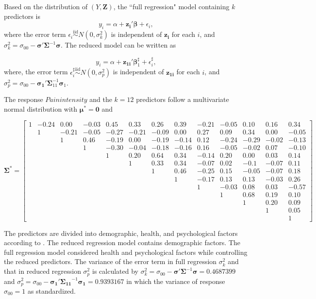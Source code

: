 \documentclass[11pt]{article}
\begin{document}
Based on the distribution of $(Y, \boldsymbol{Z})$, the ``full regression" model containing $k$ predictors is  
$$
y_i = \alpha + \boldsymbol{z_i}'\boldsymbol{\beta} + \epsilon_i,
$$
where the error term $\epsilon_i \overset{\mathrm{iid}}{\sim} N(0, \sigma^2_k)$ is independent of $\boldsymbol{z_i}$ for each $i$, 
and $\sigma^2_k = \sigma_{00} - \boldsymbol{\sigma}' \boldsymbol{\Sigma}^{-1} \boldsymbol{\sigma}$. The reduced model can be written as

$$
y_i = \alpha + \boldsymbol{z_{1i}}'\boldsymbol{\beta}_1^\sharp + \epsilon_i^\sharp,
$$
where, the error term $\epsilon_i^\sharp \overset{\mathrm{iid}}{\sim} N(0, \sigma^2_p)$ is independent of $\boldsymbol{z_{1i}}$ for each $i$, and $\sigma^2_p = \sigma_{00} - \boldsymbol{\sigma_1}' \boldsymbol{\Sigma}_{11}^{-1} \boldsymbol{\sigma}_1$. 

The response $Pain  intensity$ and the $k = 12$ predictors follow a multivariate normal distribution with $\bm{\mu}^* = \boldsymbol{0}$ and

\scriptsize{
$$
\bm{\Sigma}^* =
\left[\begin{array}{ccccccccccccc}
  1&   -0.24& 0.00 &-0.03& 0.45 &0.33 &0.26& 0.39 &-0.21& -0.05& 0.10& 0.16 &0.34\\
  &1 &-0.21& -0.05 &-0.27 &-0.21& -0.09& 0.00 &0.27& 0.09 &0.34& 0.00 &-0.05 \\
  & & 1&0.46& -0.19& 0.00& -0.19 &-0.14 &0.12& -0.24 &-0.29& -0.02& -0.13\\
  & & & 1&-0.30& -0.04 &-0.18& -0.16& 0.16 &-0.05& -0.02& 0.07& -0.10 \\
  & & & & 1&0.20& 0.64 &0.34 &-0.14& 0.20& 0.00 &0.03& 0.14 \\
  & & & & & 1&0.33 &0.34& -0.07 &0.02& -0.1& -0.07& 0.11\\
  & & & & & & 1& 0.46& -0.25 &0.15& -0.05 &-0.07 &0.18\\
  & & & & & & & 1&-0.17& 0.13& 0.13 &-0.03& 0.26\\
  & & & & & & & & 1& -0.03 &0.08 &0.03 &-0.57\\
  & & & & & & & & & 1&0.68 &0.19& 0.10\\
  & & & & & & & & & & 1&0.20 &0.09\\
  & & & & & & & & & & & 1& 0.05\\
 & & & & & & & & & & & &1
 \end{array}\right]
 $$
 }
 \normalsize
 
 
 
 
The predictors are divided into demographic, health, and psychological factors according to \cite{baker2008chronicpain}. The reduced regression model contains demographic factors. The full regression model considered health and psychological factors while controlling the reduced predictors. The variance of the error term in full regression $\sigma_k^2$ and that in reduced regression $\sigma_p^2$ is calculated by $\sigma^2_k = \sigma_{00} - \boldsymbol{\sigma}' \boldsymbol{\Sigma}^{-1} \boldsymbol{\sigma} = 0.4687399$ and $\sigma^2_p = \sigma_{00} - \boldsymbol{\sigma_1}' \boldsymbol{\Sigma_{11}}^{-1} \boldsymbol{\sigma_1} = 0.9393167$ in which the variance of response $\sigma_{00} = 1$ as standardized. 
\end{document}
